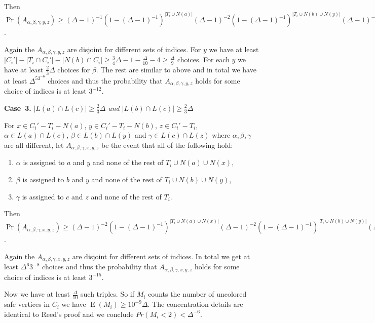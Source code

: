 \documentclass[12pt]{amsart}
\theoremstyle{plain}
\theoremstyle{definition}
\theoremstyle{remark}
\newcommand{\card}[1]{\left|#1\right|}
\newcommand{\ex}{\operatorname{E}}
\begin{document}
Then $\Pr(A_{\alpha, \beta, \gamma, y, z}) \geq (\Delta-1)^{-1}(1-
(\Delta-1)^{-1})^{\card{T_i \cup N(a)}}(\Delta-1)^{-2}(1-
(\Delta-1)^{-1})^{\card{T_i \cup N(b) \cup N(y)}}(\Delta-1)^{-2}(1-
(\Delta-1)^{-1})^{\card{T_i}} \geq (\Delta-1)^{-5}3^{-6}$.

Again the $A_{\alpha, \beta, \gamma, y, z}$ are disjoint for different sets of
indices.  For $y$ we have at least $\card{C_i'} - \card{T_i \cap C_i'} -
\card{N(b) \cap C_i} \geq \frac34 \Delta - 1 - \frac{\Delta}{10} - 4 \geq
\frac{\Delta}{9}$ choices.  For each $y$ we have at least $\frac23 \Delta$ choices for $\beta$. 
The rest are similar to above and in total we have at least $\Delta^53^{-6}$
choices and thus the probability that $A_{\alpha, \beta, \gamma, y, z}$ holds
for some choice of indices is at least $3^{-12}$.

{\bf Case~3.} {\it $\card{L(a) \cap L(c)} \geq \frac23 \Delta$ and $\card{L(b)
\cap L(c)} \geq \frac23 \Delta$}

For $x \in C_i' - T_i - N(a)$, $y \in C_i' - T_i - N(b)$, $z \in C_i' - T_i$,
$\alpha \in L(a) \cap L(c)$, $\beta \in L(b) \cap L(y)$ and $\gamma \in L(c)
\cap L(z)$ where $\alpha, \beta, \gamma$ are all different, let $A_{\alpha,
\beta, \gamma, x, y, z}$ be the event that all of the following hold:

\begin{enumerate}
  \item $\alpha$ is assigned to $a$ and $y$ and none of the rest of $T_i \cup
  N(a) \cup N(x)$,
  \item $\beta$ is assigned to $b$ and $y$ and none of the rest of $T_i \cup
  N(b) \cup N(y)$,
  \item $\gamma$ is assigned to $c$ and $z$ and none of the rest of $T_i$.
\end{enumerate}

Then $\Pr(A_{\alpha, \beta, \gamma, x, y, z}) \geq (\Delta-1)^{-2}(1-
(\Delta-1)^{-1})^{\card{T_i \cup N(a) \cup N(x)}}(\Delta-1)^{-2}(1-
(\Delta-1)^{-1})^{\card{T_i \cup N(b) \cup N(y)}}(\Delta-1)^{-2}(1-
(\Delta-1)^{-1})^{\card{T_i}} \geq (\Delta-1)^{-6}3^{-7}$.

Again the $A_{\alpha, \beta, \gamma, x, y, z}$ are disjoint for different sets
of indices. In total we get at least $\Delta^6 3^{-8}$
choices and thus the probability that $A_{\alpha, \beta, \gamma, x, y, z}$ holds
for some choice of indices is at least $3^{-15}$.

\bigskip

Now we have at least $\frac{\Delta}{10}$ such triples.  So if $M_i$ counts the
number of uncolored safe vertices in $C_i$ we have $\ex(M_i) \geq
10^{-9}\Delta$.  The concentration details are identical to Reed's proof and we
conclude $Pr(M_i < 2) < \Delta^{-6}$.
\end{document}
